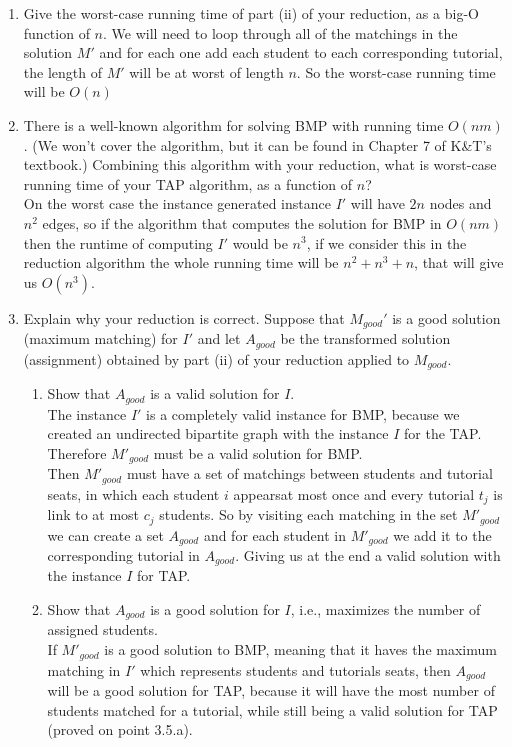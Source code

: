 \documentclass[11pt]{article}
\def\ans#1{{\color{ans}#1}}
\begin{document}
\begin{enumerate}
\item Give the worst-case running time of part (ii)
of your reduction, as a big-O function of $n$.
\ans{
  We will need to loop through all of the matchings in the solution $M'$ and 
  for each one add each student to each corresponding tutorial, the length of $M'$ will be at worst 
  of length $n$. So the worst-case running time will be $O(n)$
}

\item There is a well-known algorithm for solving BMP with running time
$O(nm)$. (We won't cover the algorithm, but it can be
found in Chapter 7 of K\&T's textbook.) Combining this algorithm
with your reduction, what is worst-case running time of
your TAP algorithm, as a function of $n$? \\
\ans{
  On the worst case the instance generated instance $I'$ will have $2n$ nodes and $n^2$ edges, so if 
  the algorithm that computes the solution for BMP in $O(nm)$ then the runtime of computing $I'$ would 
  be $n^3$, if we consider this in the reduction algorithm the whole running time will be $n^2 + n^3 + 
  n$, that will give us $O(n^3)$.
}

\item Explain why your reduction is correct.  Suppose that $M_{good}'$ is
a good solution (maximum matching) for $I'$ and let
$A_{good}$ be the transformed solution (assignment) obtained by part (ii) of
your reduction applied to $M_{good}$.

\begin{enumerate}
\item Show that $A_{good}$ is a valid solution for $I$. \\
\ans{
  The instance $I'$ is a completely valid instance for BMP, because we created an undirected 
  bipartite graph with the instance $I$ for the TAP. Therefore $M'_{good}$ must be a valid solution 
  for BMP. \\
  Then $M'_{good}$ must have a set of matchings between students and tutorial seats, in which each 
  student $i$ appearsat most once and every tutorial $t_j$ is link to at most $c_j$ students. So 
  by visiting each matching in the set $M'_{good}$ we can create a set $A_{good}$ and for each student 
  in $M'_{good}$ we add it to the corresponding tutorial in $A_{good}$. Giving us at the end a valid 
  solution with the instance $I$ for TAP.
}

\item Show that $A_{good}$ is a good solution for $I$, i.e., maximizes
the number of assigned students. \\
\ans{
  If $M'_{good}$ is a good solution to BMP, meaning that it haves the maximum matching in $I'$ which 
  represents students and tutorials seats, then $A_{good}$ will be a good solution for TAP, 
  because it will have the most number of students matched for a tutorial, while still being a 
  valid solution for TAP (proved on point 3.5.a).
}
\end{enumerate}
\end{enumerate}
\end{document}
